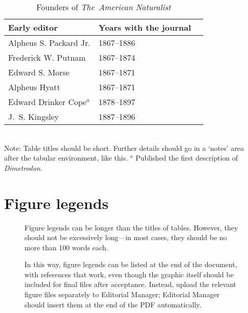\documentclass[11pt]{article}
\begin{document}
	\begin{table}[h]
		\caption{Founders of \textit{The~American Naturalist}}
		\label{Table:Founders}
		\centering
		\begin{tabular}{lll}\hline
			Early editor            & Years with the journal \\ \hline
			Alpheus S. Packard Jr.  & 1867--1886 \\
			Frederick W. Putnam     & 1867--1874 \\ 
			Edward S. Morse         & 1867--1871 \\ 
			Alpheus Hyatt           & 1867--1871 \\
			Edward Drinker Cope$^a$ & 1878--1897 \\
			J.~S. Kingsley          & 1887--1896 \\ \hline 
		\end{tabular}
		\bigskip{}
		\\
		{\footnotesize Note: Table titles should be short. Further details should go in a `notes' area after the tabular environment, like this. $^a$ Published the first description of \textit{Dimetrodon}.}
	\end{table}
	
	\newpage{}
	
	\section*{Figure legends}
	
	\begin{figure}[h!]
		\caption{Figure legends can be longer than the titles of tables. However, they should not be excessively long---in most cases, they should be no more than 100 words each.}
		\label{Fig:OkapiHorn}
	\end{figure}
	
	
	
	\begin{figure}[h!]
		\caption{In this way, figure legends can be listed at the end of the document, with references that work, even though the graphic itself should be included for final files after acceptance. Instead, upload the relevant figure files separately to Editorial Manager; Editorial Manager should insert them at the end of the PDF automatically.}
		\label{Fig:AnotherFigure}
	\end{figure}
	
	
\end{document}
